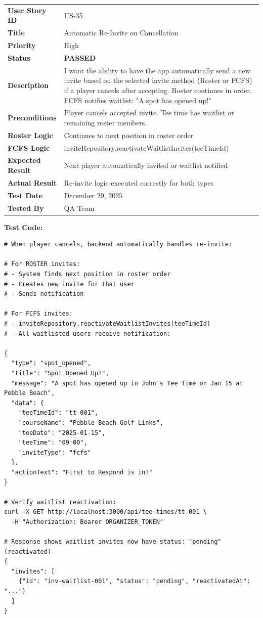 \documentclass[11pt,a4paper]{article}
\newcommand{\passed}{\textcolor{pass}{\textbf{PASSED}}}
\begin{document}
\begin{tabularx}{\textwidth}{|p{3.2cm}|Y|}
\hline
{}
 \\
\hline
\textbf{User Story ID} & US-35 \\
\hline
\textbf{Title} & Automatic Re-Invite on Cancellation \\
\hline
\textbf{Priority} & High \\
\hline
\textbf{Status} & \passed \\
\hline
\textbf{Description} & I want the ability to have the app automatically send a new invite based on the selected invite method (Roster or FCFS) if a player cancels after accepting. Roster continues in order. FCFS notifies waitlist: "A spot has opened up!" \\
\hline
\textbf{Preconditions} & Player cancels accepted invite. Tee time has waitlist or remaining roster members. \\
\hline
\textbf{Roster Logic} & Continues to next position in roster order \\
\hline
\textbf{FCFS Logic} & inviteRepository.reactivateWaitlistInvites(teeTimeId) \\
\hline
\textbf{Expected Result} & Next player automatically invited or waitlist notified \\
\hline
\textbf{Actual Result} & Re-invite logic executed correctly for both types \\
\hline
\textbf{Test Date} & December 29, 2025 \\
\hline
\textbf{Tested By} & QA Team \\
\hline
\end{tabularx}

\vspace{0.3cm}
\textbf{Test Code:}
\begin{lstlisting}
# When player cancels, backend automatically handles re-invite:

# For ROSTER invites:
# - System finds next position in roster order
# - Creates new invite for that user
# - Sends notification

# For FCFS invites:
# - inviteRepository.reactivateWaitlistInvites(teeTimeId)
# - All waitlisted users receive notification:

{
  "type": "spot_opened",
  "title": "Spot Opened Up!",
  "message": "A spot has opened up in John's Tee Time on Jan 15 at Pebble Beach",
  "data": {
    "teeTimeId": "tt-001",
    "courseName": "Pebble Beach Golf Links",
    "teeDate": "2025-01-15",
    "teeTime": "09:00",
    "inviteType": "fcfs"
  },
  "actionText": "First to Respond is in!"
}

# Verify waitlist reactivation:
curl -X GET http://localhost:3000/api/tee-times/tt-001 \
  -H "Authorization: Bearer ORGANIZER_TOKEN"

# Response shows waitlist invites now have status: "pending" (reactivated)
{
  "invites": [
    {"id": "inv-waitlist-001", "status": "pending", "reactivatedAt": "..."}
  ]
}
\end{lstlisting}
\end{document}
